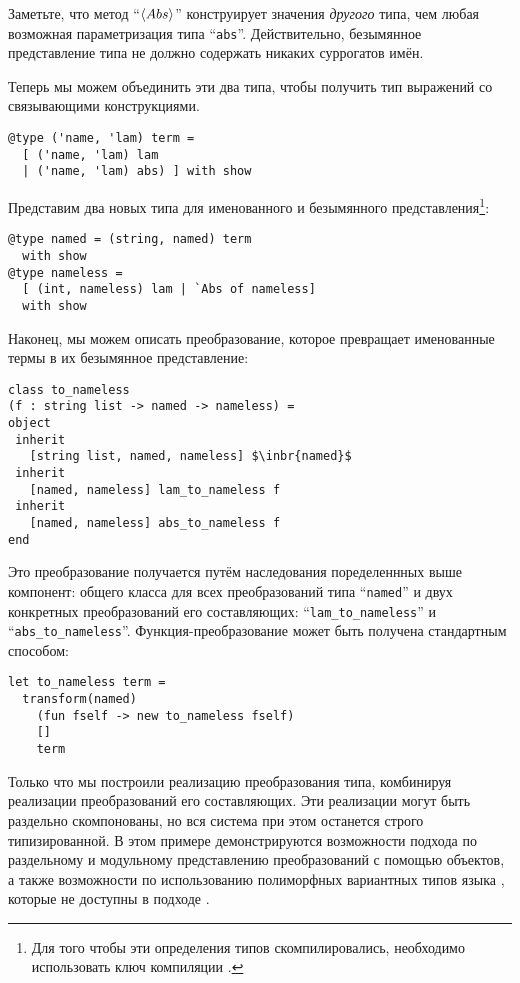 Заметьте, что метод ``$\left<Abs\right>$'' конструирует значения \emph{другого} типа, чем любая возможная параметризация типа ``\lstinline{abs}''. Действительно, безымянное представление типа не должно содержать никаких суррогатов имён.

Теперь мы можем объединить эти два типа, чтобы получить тип выражений со связывающими конструкциями.

\begin{lstlisting}
@type ('name, 'lam) term = 
  [ ('name, 'lam) lam 
  | ('name, 'lam) abs) ] with show
\end{lstlisting}

Представим два новых типа для именованного и безымянного представления\footnote{Для того чтобы эти определения типов скомпилировались, необходимо использовать ключ компиляции .}:

\begin{lstlisting}
@type named = (string, named) term 
  with show
@type nameless = 
  [ (int, nameless) lam | `Abs of nameless] 
  with show
\end{lstlisting}

Наконец, мы можем описать преобразование, которое превращает именованные термы в их безымянное представление:

\begin{lstlisting}
class to_nameless
(f : string list -> named -> nameless) = 
object
 inherit 
   [string list, named, nameless] $\inbr{named}$
 inherit 
   [named, nameless] lam_to_nameless f
 inherit 
   [named, nameless] abs_to_nameless f
end
\end{lstlisting}

Это преобразование получается путём наследования поределеннных выше компонент: общего класса для всех преобразований типа ``\lstinline{named}'' 
и двух конкретных преобразований его составляющих: 
``\lstinline{lam_to_nameless}'' и ``\lstinline{abs_to_nameless}''.
Функция-преобразование может быть получена стандартным способом:

\begin{lstlisting}
let to_nameless term =
  transform(named) 
    (fun fself -> new to_nameless fself) 
    [] 
    term
\end{lstlisting}

Только что мы построили реализацию преобразования типа, комбинируя реализации преобразований его составляющих. Эти  реализации могут быть раздельно скомпонованы, но вся система при этом останется строго типизированной. В этом примере демонстрируются возможности подхода по раздельному и модульному представлению преобразований с помощью объектов, а также возможности по использованию полиморфных вариантных типов языка \ocaml{}, которые не доступны в подходе \visitors{}.

